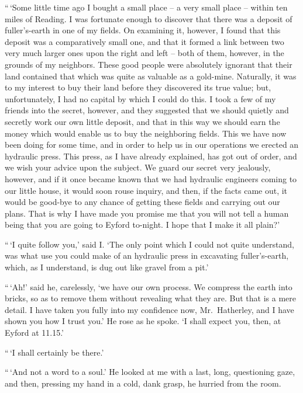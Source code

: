 “\,‘Some little time ago I bought a small place -- a very small
place -- within ten miles of Reading. I was fortunate enough
to discover that there was a deposit of fuller’s-earth in one of
my fields. On examining it, however, I found that this deposit
was a comparatively small one, and that it formed a link
between two very much larger ones upon the right and left -- both
of them, however, in the grounds of my neighbors. These
good people were absolutely ignorant that their land contained
that which was quite as valuable as a gold-mine. Naturally,
it was to my interest to buy their land before they discovered
its true value; but, unfortunately, I had no capital by which
I could do this. I took a few of my friends into the secret,
however, and they suggested that we should quietly and secretly
work our own little deposit, and that in this way we
should earn the money which would enable us to buy the
neighboring fields. This we have now been doing for some
time, and in order to help us in our operations we erected an
hydraulic press. This press, as I have already explained, has
got out of order, and we wish your advice upon the subject.
We guard our secret very jealously, however, and if it once
became known that we had hydraulic engineers coming to our
little house, it would soon rouse inquiry, and then, if the facts
came out, it would be good-bye to any chance of getting these
fields and carrying out our plans. That is why I have made
you promise me that you will not tell a human being that you
are going to Eyford to-night. I hope that I make it all plain?’

“\,‘I quite follow you,’ said I. ‘The only point which I
could not quite understand, was what use you could make of
an hydraulic press in excavating fuller’s-earth, which, as I
understand, is dug out like gravel from a pit.’

“\,‘Ah!’ said he, carelessly, ‘we have our own process. We
compress the earth into bricks, so as to remove them without
revealing what they are. But that is a mere detail. I have
taken you fully into my confidence now, Mr.~Hatherley, and I
have shown you how I trust you.’ He rose as he spoke. ‘I
shall expect you, then, at Eyford at 11.15.’

“\,‘I shall certainly be there.’

“\,‘And not a word to a soul.’ He looked at me with a last,
long, questioning gaze, and then, pressing my hand in a cold,
dank grasp, he hurried from the room.

